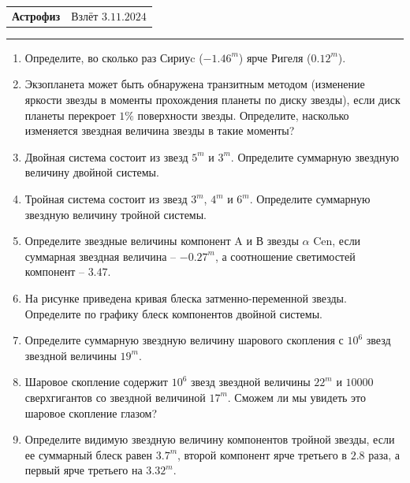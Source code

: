 \documentclass[12pt]{article}
\begin{document}
\begin{tabularx}{\textwidth}{Xr}
{\Large \textbf{Астрофиз}} & Взлёт $3.11.2024$ \\
\end{tabularx}
\noindent\rule{\textwidth}{0.4pt}
\begin{enumerate}
    \item Определите, во сколько раз Сириуc ($-1.46^{m}$) ярче Ригеля ($0.12^m$).
    \item Экзопланета может быть обнаружена транзитным методом (изменение яркости звезды в моменты прохождения планеты по диску звезды), если диск планеты перекроет $1\%$ поверхности звезды. Определите, насколько изменяется звездная величина звезды в такие моменты?
    \item Двойная система состоит из звезд $5^{m}$ и $3^{m}$. Определите суммарную звездную величину двойной системы. 
    \item Тройная система состоит из звезд $3^{m}$, $4^{m}$  и $6^{m}$. Определите суммарную звездную величину тройной системы.
    \item Определите звездные величины компонент A и В звезды $\alpha$ Cen, если суммарная звездная величина -- $-0.27^m$, а соотношение светимостей компонент -- $3.47$.
    \item На рисунке приведена кривая блеска  затменно-переменной звезды. Определите по графику блеск компонентов двойной системы.

    \begin{figure}[h] 	
        \centering
    \end{figure} 
    \item Определите суммарную звездную величину шарового скопления с $10^{6}$ звезд звездной величины $19^m$.
    \item Шаровое скопление содержит $10^{6}$ звезд звездной величины $22^m$ и $10 000$ сверхгигантов со звездной величиной $17^m$. Сможем ли мы увидеть это шаровое скопление глазом?
    \item Определите видимую звездную величину компонентов тройной звезды, если ее суммарный блеск равен $3.7^m$, второй компонент ярче третьего в $2.8$ раза, а первый ярче третьего на $3.32^m$.


\end{enumerate}
\end{document}
